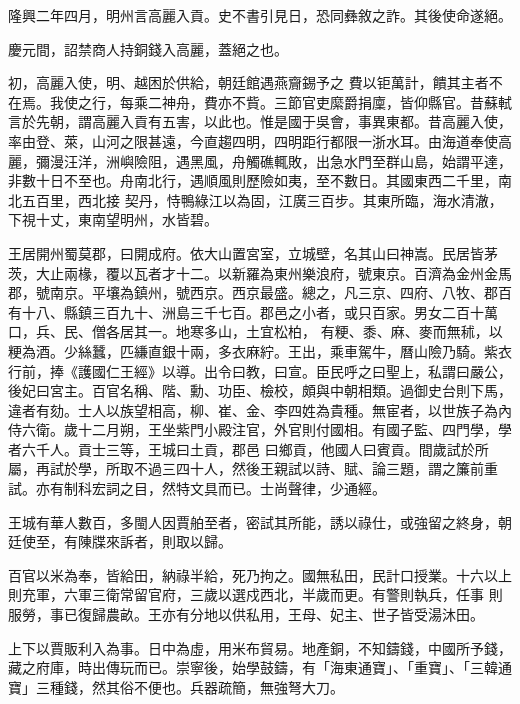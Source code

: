\begin{pinyinscope}
 隆興二年四月，明州言高麗入貢。史不書引見日，恐同彝敘之詐。其後使命遂絕。



 慶元間，詔禁商人持銅錢入高麗，蓋絕之也。



 初，高麗入使，明、越困於供給，朝廷館遇燕齎錫予之
 費以钜萬計，饋其主者不在焉。我使之行，每乘二神舟，費亦不貲。三節官吏縻爵捐廩，皆仰縣官。昔蘇軾言於先朝，謂高麗入貢有五害，以此也。惟是國于吳會，事異東都。昔高麗入使，率由登、萊，山河之限甚遠，今直趨四明，四明距行都限一浙水耳。由海道奉使高麗，彌漫汪洋，洲嶼險阻，遇黑風，舟觸礁輒敗，出急水門至群山島，始謂平達，非數十日不至也。舟南北行，遇順風則歷險如夷，至不數日。其國東西二千里，南北五百里，西北接
 契丹，恃鴨綠江以為固，江廣三百步。其東所臨，海水清澈，下視十丈，東南望明州，水皆碧。



 王居開州蜀莫郡，曰開成府。依大山置宮室，立城壁，名其山曰神嵩。民居皆茅茨，大止兩椽，覆以瓦者才十二。以新羅為東州樂浪府，號東京。百濟為金州金馬郡，號南京。平壤為鎮州，號西京。西京最盛。總之，凡三京、四府、八牧、郡百有十八、縣鎮三百九十、洲島三千七百。郡邑之小者，或只百家。男女二百十萬口，兵、民、僧各居其一。地寒多山，土宜松柏，
 有粳、黍、麻、麥而無秫，以粳為酒。少絲蠶，匹縑直銀十兩，多衣麻紵。王出，乘車駕牛，曆山險乃騎。紫衣行前，捧《護國仁王經》以導。出令曰教，曰宣。臣民呼之曰聖上，私謂曰嚴公，後妃曰宮主。百官名稱、階、勳、功臣、檢校，頗與中朝相類。過御史台則下馬，違者有劾。士人以族望相高，柳、崔、金、李四姓為貴種。無宦者，以世族子為內侍六衛。歲十二月朔，王坐紫門小殿注官，外官則付國相。有國子監、四門學，學者六千人。貢士三等，王城曰土貢，郡邑
 曰鄉貢，他國人曰賓貢。間歲試於所屬，再試於學，所取不過三四十人，然後王親試以詩、賦、論三題，謂之簾前重試。亦有制科宏詞之目，然特文具而已。士尚聲律，少通經。



 王城有華人數百，多閩人因賈舶至者，密試其所能，誘以祿仕，或強留之終身，朝廷使至，有陳牒來訴者，則取以歸。



 百官以米為奉，皆給田，納祿半給，死乃拘之。國無私田，民計口授業。十六以上則充軍，六軍三衛常留官府，三歲以選戍西北，半歲而更。有警則執兵，任事
 則服勞，事已復歸農畝。王亦有分地以供私用，王母、妃主、世子皆受湯沐田。



 上下以賈販利入為事。日中為虛，用米布貿易。地產銅，不知鑄錢，中國所予錢，藏之府庫，時出傳玩而已。崇寧後，始學鼓鑄，有「海東通寶」、「重寶」、「三韓通寶」三種錢，然其俗不便也。兵器疏簡，無強弩大刀。




\end{pinyinscope}
